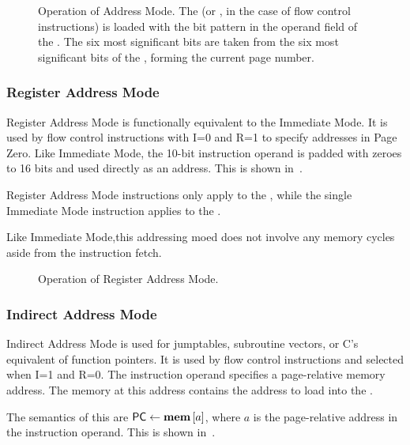 \begin{figure}[htb]
 \centering
 
\caption[Address Mode]{\label{fig:address-mode} Operation of Address Mode. The
  \AC{} (or \PC{}, in the case of flow control instructions) is loaded with the
  bit pattern in the operand field of the \IR. The six most significant bits
  are taken from the six most significant bits of the \PC, forming the current
  page number.}
\end{figure}




\subsubsection{Register Address Mode}
\label{sec:register-address-mode}

Register Address Mode is functionally equivalent to the Immediate Mode. It is
used by flow control instructions with I=0 and R=1 to specify addresses in
\gls{Page Zero}. Like Immediate Mode, the 10-bit instruction operand is padded
with zeroes to 16 bits and used directly as an address. This is shown
in~.

Register Address Mode instructions only apply to the \PC, while the single
Immediate Mode instruction applies to the \AC.

Like Immediate Mode,this addressing moed does not involve any memory cycles
aside from the instruction fetch.

\begin{figure}[htb]
 \centering
     
 \caption[Register Address Mode]{\label{fig:register-address-mode} Operation
   of Register Address Mode.}
\end{figure}


\subsubsection{Indirect Address Mode}
\label{sec:indirect-address-mode}

Indirect Address Mode is used for jumptables, subroutine vectors, or C's
equivalent of function pointers. It is used by flow control instructions and
selected when I=1 and R=0. The instruction operand specifies a page-relative
memory address. The memory at this address contains the address to load into
the \PC.

The semantics of this are $\mbox{\PC}\eq\mem{a}$, where $a$ is the
page-relative address in the instruction operand. This is shown
in~.

